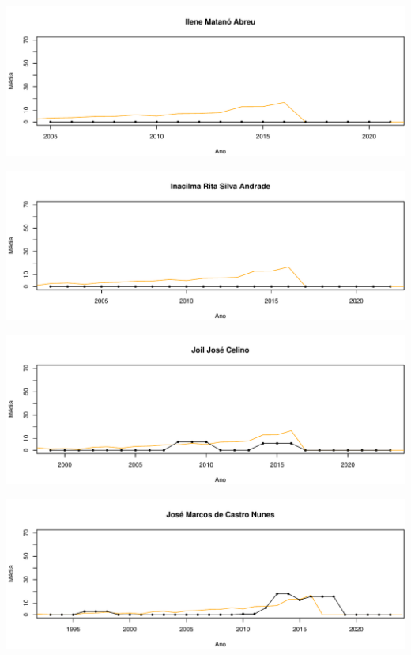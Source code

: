 \documentclass[12pt,brazil]{article}\usepackage[]{graphicx}\usepackage[]{xcolor}
\makeatletter
\def\maxwidth{ %
  \ifdim\Gin@nat@width>\linewidth
    \linewidth
  \else
    \Gin@nat@width
  \fi
}
\makeatother
\begin{document}
\vspace{0.5cm}


{\centering \includegraphics[width=\maxwidth]{figure/mediamovel-31} 

}



\vspace{0.5cm}


{\centering \includegraphics[width=\maxwidth]{figure/mediamovel-32} 

}



\vspace{0.5cm}


{\centering \includegraphics[width=\maxwidth]{figure/mediamovel-33} 

}



\vspace{0.5cm}


{\centering \includegraphics[width=\maxwidth]{figure/mediamovel-34} 

}
\end{document}
